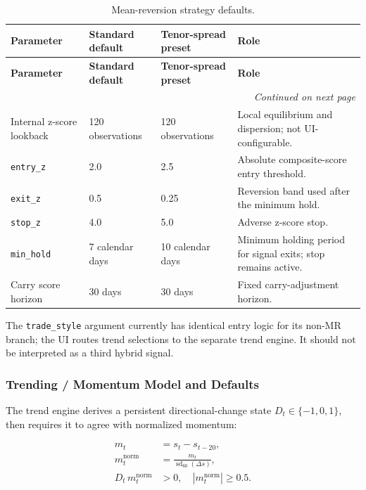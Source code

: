 {\small
\setlength{\LTleft}{0pt}
\setlength{\LTright}{0pt}
\setlength{\tabcolsep}{5pt}
\renewcommand{\arraystretch}{1.15}
\begin{longtable}{p{} p{} p{} p{}}
\caption{Mean-reversion strategy defaults.}\label{tab:pairs-mr-defaults-overleaf} \\
\hline
\textbf{Parameter} & \textbf{Standard default} & \textbf{Tenor-spread preset} & \textbf{Role} \\
\hline
\endfirsthead
\hline
\textbf{Parameter} & \textbf{Standard default} & \textbf{Tenor-spread preset} & \textbf{Role} \\
\hline
\endhead
\hline
\multicolumn{4}{r}{\textit{Continued on next page}} \\
\hline
\endfoot
\hline
\endlastfoot
Internal z-score lookback & 120 observations & 120 observations & Local equilibrium and dispersion; not UI-configurable. \\
\texttt{entry\_z} & 2.0 & 2.5 & Absolute composite-score entry threshold. \\
\texttt{exit\_z} & 0.5 & 0.25 & Reversion band used after the minimum hold. \\
\texttt{stop\_z} & 4.0 & 5.0 & Adverse z-score stop. \\
\texttt{min\_hold} & 7 calendar days & 10 calendar days & Minimum holding period for signal exits; stop remains active. \\
Carry score horizon & 30 days & 30 days & Fixed carry-adjustment horizon. \\
\end{longtable}
}

The \texttt{trade\_style} argument currently has identical entry logic for its non-MR
branch; the UI routes trend selections to the separate trend engine. It should not
be interpreted as a third hybrid signal.

\subsubsection{Trending / Momentum Model and Defaults}

The trend engine derives a persistent directional-change state
$D_t \in \{-1,0,1\}$, then requires it to agree with normalized momentum:

\begin{equation}
\begin{aligned}
m_t &= s_t - s_{t-20}, \\
m_t^{\mathrm{norm}} &= \frac{m_t}{\operatorname{sd}_{60}(\Delta s)}, \\
D_t\,m_t^{\mathrm{norm}} &> 0, \quad \left|m_t^{\mathrm{norm}}\right| \ge 0.5.
\end{aligned}
\end{equation}

